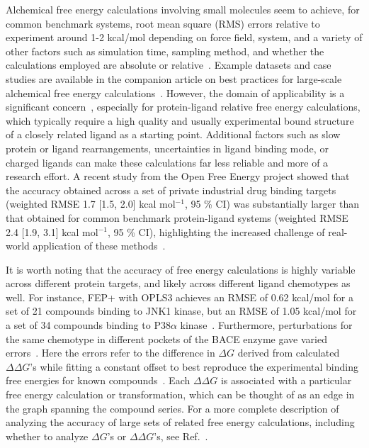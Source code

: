 \documentclass[9pt,bestpractices]{livecoms}
\begin{document}
Alchemical free energy calculations involving small molecules seem to achieve, for common benchmark systems, root mean square (RMS) errors relative to experiment around 1-2 kcal/mol depending on force field, system, and a variety of other factors such as simulation time, sampling method, and whether the calculations employed are absolute or relative~\cite{baumann2025largescale, fuMetaAnalysisRevealsThat2022, hahn2024current, gapsys2020large}. Example datasets and case studies are available in the companion article on best practices for large-scale alchemical free energy calculations~\cite{mey_largescale_inprep}.
However, the domain of applicability is a significant concern~\cite{sherborne2016collaborating, cournia2017relative, baumann2025largescale}, especially for protein-ligand relative free energy calculations, which typically require a high quality and usually experimental bound structure of a closely
related ligand as a starting point. Additional factors such as slow protein or ligand rearrangements, uncertainties in ligand binding mode, or charged ligands can make these calculations far less reliable and more of a research effort. A recent study from the Open Free Energy project showed that the accuracy obtained across a set of private industrial drug binding targets (weighted RMSE 1.7 [1.5, 2.0] kcal mol$^{-1}$, 95 \% CI) was substantially larger than that obtained for common benchmark protein-ligand systems (weighted RMSE 2.4 [1.9, 3.1] kcal mol$^{-1}$, 95 \% CI), highlighting the increased challenge of real-world application of these methods~\cite{baumann2025largescale}.

It is worth noting that the accuracy of free energy calculations is highly variable across different protein targets, and likely across different ligand chemotypes as well. For instance, FEP+ with OPLS3 achieves an RMSE of 0.62 kcal/mol for a set of 21 compounds binding to JNK1 kinase, but an RMSE of 1.05 kcal/mol for a set of 34 compounds binding to P38$\alpha$ kinase~\cite{harder2016opls3}.
Furthermore, perturbations for the same chemotype in different pockets of the BACE enzyme gave varied errors~\cite{keranen2017acylguanidine}. Here the errors refer to the difference in $\Delta G$ derived from calculated $\Delta \Delta G$'s while fitting a constant offset to best reproduce the experimental binding free energies for known compounds~\cite{wang2015accurate}. Each $\Delta \Delta G$ is associated with a particular free energy calculation or transformation, which can be thought of as an edge in the graph spanning the compound series.  For a more complete description of analyzing the accuracy of large sets of related free energy calculations, including whether to analyze $\Delta G$'s or $\Delta \Delta G$'s, see Ref.~\cite{mey_largescale_inprep}.
\end{document}
